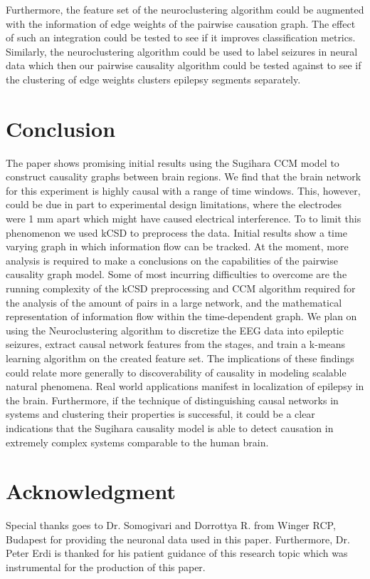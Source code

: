 \documentclass[journal,12pt,onecolumn,draftclsnofoot]{IEEEtran}  %
\begin{document}
Furthermore, the feature set of the neuroclustering algorithm could be augmented with the information of edge weights of the pairwise causation graph. The effect of such an integration could be tested to see if it improves classification metrics. Similarly, the neuroclustering algorithm could be used to label seizures in neural data which then our pairwise causality algorithm could be tested against to see if the clustering of edge weights clusters epilepsy segments separately.


\section{Conclusion}
The paper shows promising initial results using the Sugihara CCM model to construct causality graphs between brain regions. We find that the brain network for this experiment is highly causal with a range of time windows. This, however, could be due in part to experimental design limitations, where the electrodes were 1 mm apart which might have caused electrical interference. To to limit this phenomenon we used kCSD to preprocess the data. Initial results show a time varying graph in which information flow can be tracked. At the moment, more analysis is required to make a conclusions on the capabilities of the pairwise causality graph model. Some of most incurring difficulties to overcome are the running complexity of the kCSD preprocessing and CCM algorithm required for the analysis of the amount of pairs in a large network, and the mathematical representation of information flow within the time-dependent graph. We plan on using the Neuroclustering algorithm to discretize the EEG data into epileptic seizures, extract causal network features from the stages, and train a k-means learning algorithm on the created feature set. The implications of these findings could relate more generally to discoverability of causality in modeling scalable natural phenomena. Real world applications manifest in localization of epilepsy in the brain. Furthermore, if the technique of distinguishing causal networks in systems and clustering their properties is successful, it could be a clear indications that the Sugihara causality model is able to detect causation in extremely complex systems comparable to the human brain.

\section*{Acknowledgment}

Special thanks goes to Dr. Somogivari and Dorrottya R. from Winger RCP, Budapest for providing the neuronal data used in this paper. Furthermore, Dr. Peter Erdi is thanked for his patient guidance of this research topic which was instrumental for the production of this paper.

\balance


\end{document}
